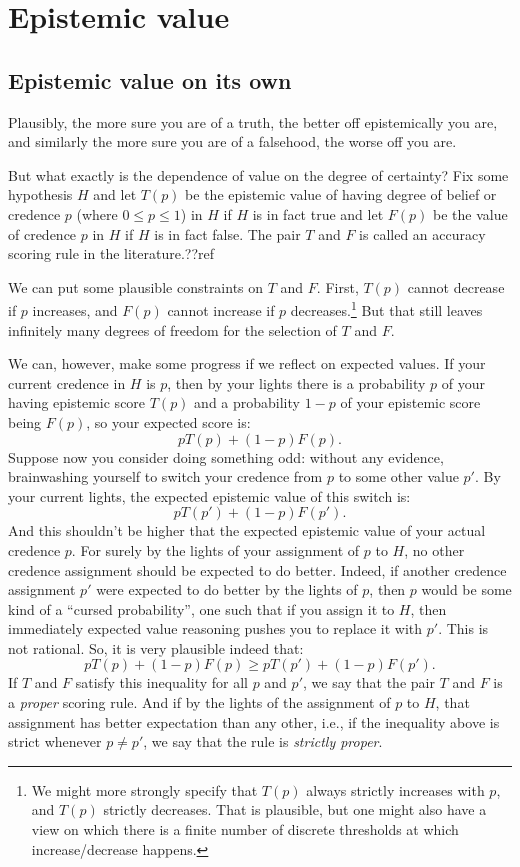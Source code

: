 \section{Epistemic value}
\subsection{Epistemic value on its own}
Plausibly, the more sure you are of a truth, the better off epistemically you are, and similarly the more sure you are
of a falsehood, the worse off you are. 

But what exactly is the dependence of value on the degree of certainty? Fix some hypothesis $H$ and let $T(p)$ be the epistemic value of 
having degree of belief or credence $p$ (where $0\le p\le 1$) in $H$ if $H$ is in fact true and let $F(p)$ be the value of credence
$p$ in $H$ if $H$ is in fact false. The pair $T$ and $F$ is called an accuracy scoring rule in the literature.??ref 

We can put some plausible constraints on $T$ and $F$. First, $T(p)$ cannot decrease if $p$ increases,
and $F(p)$ cannot increase if $p$ decreases.\footnote{We might more strongly specify that $T(p)$ always strictly increases with $p$, and $T(p)$
strictly decreases. That is
plausible, but one might also have a view on which there is a finite number of discrete thresholds at which increase/decrease happens.}
But that still leaves infinitely many degrees of freedom for the selection of $T$ and $F$.

We can, however, make some progress if we reflect on expected values. If your current credence in $H$ is $p$, then by your lights
there is a probability $p$ of your having epistemic score $T(p)$ and a probability $1-p$ of your epistemic score being $F(p)$, so
your expected score is:
$$
    p T(p) + (1-p) F(p).
$$
Suppose now you consider doing something odd: without any evidence, brainwashing yourself to switch your credence from $p$ to some 
other value $p'$. By your current lights, the expected epistemic value of this switch is:
$$
    p T(p') + (1-p) F(p').
$$
And this shouldn't be higher that the expected epistemic value of your actual credence $p$. For surely by the lights of your
assignment of $p$ to $H$, no other credence assignment should be expected to do better. Indeed, if another credence assignment
$p'$ were expected to do better by the lights of $p$, then $p$ would be some kind of a ``cursed probability'', one such that
if you assign it to $H$, then immediately expected value reasoning pushes you to replace it with $p'$. This is not rational.
So, it is very plausible indeed that:
$$
    p T(p) + (1-p) F(p) \ge
    p T(p') + (1-p) F(p').
$$
If $T$ and $F$ satisfy this inequality for all $p$ and $p'$, we say that the pair $T$ and $F$ is a \textit{proper} scoring rule.
And if by the lights of the assignment of $p$ to $H$, that assignment has better expectation than any other, i.e., if the
inequality above is strict whenever $p\ne p'$, we say that the rule is \textit{strictly proper}.

